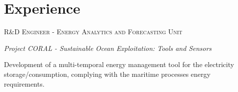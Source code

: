 \documentclass{mycv}
\begin{document}
\section{Experience}
\textsc{R\&D Engineer - Energy Analytics and Forecasting Unit}

\begin{myitemize}
	\item \textit{Project CORAL - Sustainable Ocean Exploitation: Tools and Sensors}
	
	Development of a multi-temporal energy management tool for the electricity
	storage/consumption, complying with the maritime processes energy
	requirements.
	
	
\end{myitemize}


\end{document}

